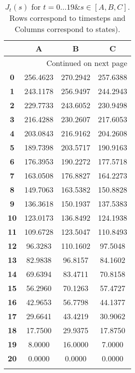 \documentclass{article}
\begin{document}
\begin{longtable}{|c|c|c|c|}
\toprule
{} &         A &         B &         C \\
\midrule
\endhead
\midrule
\multicolumn{4}{r}{{Continued on next page}} \\
\midrule
\endfoot

\bottomrule
\endlastfoot
\textbf{0 } &  256.4623 &  270.2942 &  257.6388 \\\hline
\textbf{1 } &  243.1178 &  256.9497 &  244.2943 \\\hline
\textbf{2 } &  229.7733 &  243.6052 &  230.9498 \\\hline
\textbf{3 } &  216.4288 &  230.2607 &  217.6053 \\\hline
\textbf{4 } &  203.0843 &  216.9162 &  204.2608 \\\hline
\textbf{5 } &  189.7398 &  203.5717 &  190.9163 \\\hline
\textbf{6 } &  176.3953 &  190.2272 &  177.5718 \\\hline
\textbf{7 } &  163.0508 &  176.8827 &  164.2273 \\\hline
\textbf{8 } &  149.7063 &  163.5382 &  150.8828 \\\hline
\textbf{9 } &  136.3618 &  150.1937 &  137.5383 \\\hline
\textbf{10} &  123.0173 &  136.8492 &  124.1938 \\\hline
\textbf{11} &  109.6728 &  123.5047 &  110.8493 \\\hline
\textbf{12} &   96.3283 &  110.1602 &   97.5048 \\\hline
\textbf{13} &   82.9838 &   96.8157 &   84.1602 \\\hline
\textbf{14} &   69.6394 &   83.4711 &   70.8158 \\\hline
\textbf{15} &   56.2960 &   70.1263 &   57.4727 \\\hline
\textbf{16} &   42.9653 &   56.7798 &   44.1377 \\\hline
\textbf{17} &   29.6641 &   43.4219 &   30.9062 \\\hline
\textbf{18} &   17.7500 &   29.9375 &   17.8750 \\\hline
\textbf{19} &    8.0000 &   16.0000 &    7.0000 \\\hline
\textbf{20} &    0.0000 &    0.0000 &    0.0000 \\\hline
\caption{$J_t(s)$ for $t=0 \dots 19 \& s \in [A, B, C]$. Rows correspond to timesteps and Columns correspond to states).}
\end{longtable}
\end{document}
